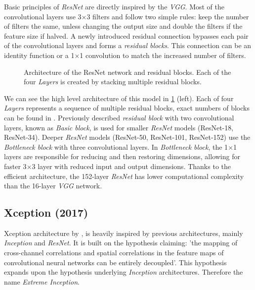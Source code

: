 Basic principles of \textit{ResNet} are directly inspired by the \textit{VGG}. Most of the convolutional layers use 3$\times$3 filters and follow two simple rules: keep the number of filters the same, unless changing the output size and double the filters if the feature size if halved. A newly introduced residual connection bypasses each pair of the convolutional layers and forms a \textit{residual blocks}. This connection can be an identity function or a 1$\times$1 convolution to match the increased number of filters.

\begin{figure}
    \resnetArch
    \caption[ResNet architecture]%
    {Architecture of the ResNet network and residual blocks. Each of the four \textit{Layers} is created by stacking multiple residual blocks.}
    \label{fig:resnet_arch}
\end{figure}

We can see the high level architecture of this model in \cref{fig:resnet_arch} (left). Each of four \textit{Layers} represents a sequence of multiple residual blocks, exact numbers of blocks can be found in \cite[table 1]{bib:resnet}. Previously described \textit{residual block} with two convolutional layers, known as \textit{Basic block}, is used for smaller \textit{ResNet} models (ResNet-18, ResNet-34). Deeper \textit{ResNet} models (ResNet-50, ResNet-101, ResNet-152) use the \textit{Bottleneck block} with three convolutional layers. In \textit{Bottleneck block}, the 1$\times$1 layers are responsible for reducing and then restoring dimensions, allowing for faster 3$\times$3 layer with reduced input and output dimensions. Thanks to the efficient architecture, the 152-layer \textit{ResNet} has lower computational complexity than the 16-layer \textit{VGG} network.



\subsection{Xception (2017)}
\label{sec:xception}
Xception architecture by \citeauthor{bib:xception} \cite{bib:xception}, is heavily inspired by previous architectures, mainly \textit{Inception} and \textit{ResNet}. It is built on the hypothesis claiming: 'the mapping of cross-channel correlations and spatial correlations in the feature maps of convolutional neural networks can be entirely decoupled'. This hypothesis expands upon the hypothesis underlying \textit{Inception} architectures. Therefore the name \textit{Extreme Inception}. 

